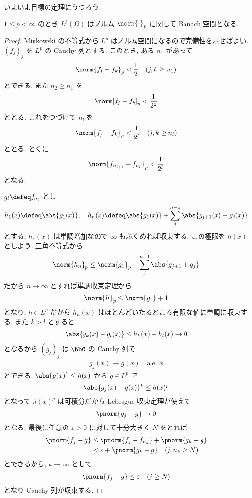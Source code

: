 \documentclass[openany, a4paper, oneside]{jsbook}
\begin{document}
いよいよ目標の定理にうつろう.
\begin{thm}
 $1 \le p < \infty$ のとき $L^p(\Omega)$ はノルム $\norm{\cdot}_p$ に関して Banach 空間となる.
\end{thm}
\begin{proof}
Minkowski の不等式から $L^p$ はノルム空間になるので完備性を示せばよい.
$(f_j)_j$ を $L^p$ の Cauchy 列とする.
このとき, ある $n_1$ があって
\begin{align}
 \norm{f_j - f_k}_p
 <
 \frac{1}{2} \quad (j, k \ge n_1)
\end{align}
とできる.
また $n_2 \ge n_1$ を
\begin{align}
 \norm[f_j - f_k]_p
 <
 \frac{1}{2^2}
\end{align}
ととる.
これをつづけて $n_l$ を
\begin{align}
 \norm{f_j - f_k}_p
 <
 \frac{1}{2^l} \quad (j, k \ge n_l)
\end{align}
ととる.
とくに
\begin{align}
 \norm{f_{n_{l + 1}} - f_{n_l}}_p
 <
 \frac{1}{2^l}
\end{align}
となる.

$g_l \defeq f_{n_l}$ とし
\begin{align}
 h_1(x)
 \defeq
 \abs{g_1 (x)}, \quad
 h_n(x)
 \defeq
 \abs{g_1(x)} + \sum_j^{n-1} \abs{g_{j+1}(x) - g_j(x)}
\end{align}
とする.
$h_n(x)$ は単調増加なので $\infty$ もふくめれば収束する.
この極限を $h(x)$ としよう.
三角不等式から
\begin{align}
 \norm{h_n}_p
 \leq
 \norm{g_1}_p + \sum_{j}^{n - 1} \abs{g_{j + 1} + g_j}
\end{align}
だから $n \to \infty$ とすれば単調収束定理から
\begin{align}
 \norm{h}_p
 \leq
 \norm{g_1} + 1
\end{align}
となり, $h \in L^p$ だから $h_n(x)$ はほとんどいたるところ有限な値に単調に収束する.
また $k > l$ とすると
\begin{align}
 \abs{g_k(x) - g_l(x)}
 \leq
 h_k(x) - h_l(x) \to 0
\end{align}
となるから $(g_j)_j$ は $\bbC$ の Cauchy 列で
\begin{align}
 g_j(x) \to g(x) \quad \text{a.e. } x
\end{align}
とできる.
$\abs{g(x)} \leq h(x)$ から $g \in L^p$ で
\begin{align}
 \abs{g_j(x) - g(x)}^p
 \leq
 h(x)^p
\end{align}
となって $h(x)^p$ は可積分だから Lebesgue 収束定理が使えて
\begin{align}
 \pnorm{g_j - g} \to 0
\end{align}
となる.
最後に任意の $\varepsilon > 0$ に対して十分大きく $N$ をとれば
\begin{align}
 \pnorm{f_j - g}
 &\leq
 \pnorm{f_j - f_{n_k}} + \pnorm{g_k - g} \\
 &<
 \varepsilon + \pnorm{g_k - g} \quad (j, n_k \geq N)
\end{align}
とできるから, $k \to \infty$ として
\begin{align}
 \pnorm{f_j - g}
 \leq
 \varepsilon \quad (j \geq N)
\end{align}
となり Cauchy 列が収束する.
\end{proof}
\end{document}
